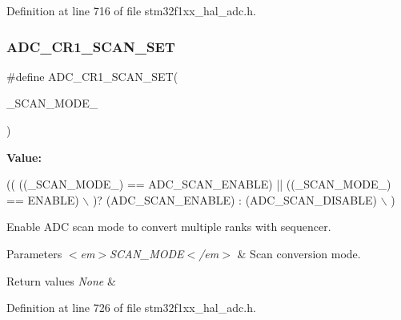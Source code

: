 Definition at line 716 of file stm32f1xx\+\_\+hal\+\_\+adc.\+h.

\mbox{\label{group___a_d_c___private___macros_ga8cd628bbd49f48a40b2de13077c7ba3d}} 
\subsubsection{\texorpdfstring{A\+D\+C\+\_\+\+C\+R1\+\_\+\+S\+C\+A\+N\+\_\+\+S\+ET}{ADC\_CR1\_SCAN\_SET}}
{\footnotesize\ttfamily \#define A\+D\+C\+\_\+\+C\+R1\+\_\+\+S\+C\+A\+N\+\_\+\+S\+ET(\begin{DoxyParamCaption}\item[{}]{\+\_\+\+S\+C\+A\+N\+\_\+\+M\+O\+D\+E\+\_\+ }\end{DoxyParamCaption})}

{\bfseries Value\+:}
\begin{DoxyCode}
(( ((\_SCAN\_MODE\_) == ADC\_SCAN\_ENABLE) || ((\_SCAN\_MODE\_) == ENABLE)           \(\backslash\)
   )? (ADC\_SCAN\_ENABLE) : (ADC\_SCAN\_DISABLE)                                   \(\backslash\)
  )
\end{DoxyCode}


Enable A\+DC scan mode to convert multiple ranks with sequencer. 


\begin{DoxyParams}{Parameters}
{\em $<$em$>$\+S\+C\+A\+N\+\_\+\+M\+O\+D\+E$<$/em$>$} & Scan conversion mode. \\
\hline
\end{DoxyParams}

\begin{DoxyRetVals}{Return values}
{\em None} & \\
\hline
\end{DoxyRetVals}


Definition at line 726 of file stm32f1xx\+\_\+hal\+\_\+adc.\+h.

\mbox{\label{group___a_d_c___private___macros_gae92924f248b2fd7693ce648275a8087c}} 
